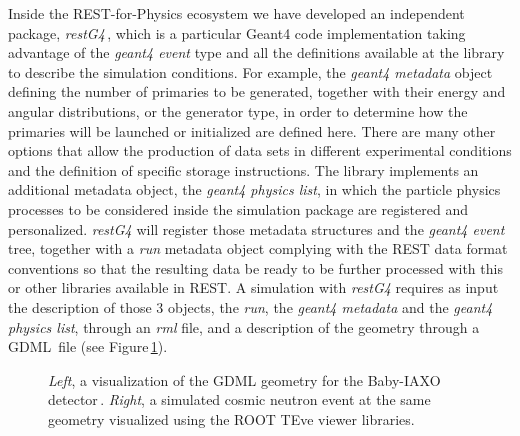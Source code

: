 Inside the REST-for-Physics ecosystem we have developed an independent package, \emph{restG4}\,\cite{REST_restG4_Git}, which is a particular Geant4 code implementation taking advantage of the \emph{geant4 event} type and all the definitions available at the library to describe the simulation conditions. For example, the \emph{geant4 metadata} object defining the number of primaries to be generated, together with their energy and angular distributions, or the generator type, in order to determine how the primaries will be launched or initialized are defined here. There are many other options that allow the production of data sets in different experimental conditions and the definition of specific storage instructions. The library implements an additional metadata object, the \emph{geant4 physics list}, in which the particle physics processes to be considered inside the simulation package are registered and personalized. \emph{restG4} will register those metadata structures and the \emph{geant4 event} tree, together with a \emph{run} metadata object complying with the REST data format conventions so that the resulting data be ready to be further processed with this or other libraries available in REST. A simulation with \emph{restG4} requires as input the description of those 3 objects, the \emph{run}, the \emph{geant4 metadata} and the \emph{geant4 physics list}, through an \emph{rml} file, and a description of the geometry through a GDML\,\cite{Chytracek:2006be} file (see Figure\,\ref{fig:geant4lib}).



\begin{figure}[htb!]
  \centering
	\caption{\emph{Left}, a visualization of the GDML geometry for the Baby-IAXO detector\,\cite{BabyIAXO:2020mzw}. \emph{Right}, a simulated cosmic neutron event at the same geometry visualized using the ROOT TEve viewer libraries.}\label{fig:geant4lib}
\end{figure}

